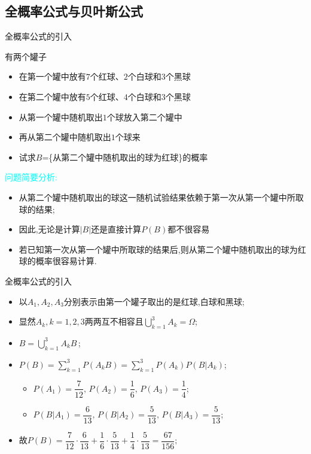 \subsection{全概率公式与贝叶斯公式}
\begin{frame}{全概率公式的引入}

	\begin{exam}
		有两个罐子
			\begin{itemize}[<+-|alert@+>]
			\item 在第一个罐中放有$7$个红球、$2$个白球和$3$个黑球
			\item 在第二个罐中放有$5$个红球、$4$个白球和$3$个黑球
			\item 从第一个罐中随机取出$1$个球放入第二个罐中
			\item 再从第二个罐中随机取出$1$个球来
			\item 试求$B$=\{从第二个罐中随机取出的球为红球\}的概率
		\end{itemize}
	\end{exam}
	\pause
	 \textcolor{cyan}{问题简要分析:}
	\begin{itemize}[<+-|alert@+>]
		\item 从第二个罐中随机取出的球这一随机试验结果依赖于第一次从第一个罐中所取球的结果;
		\item 因此,无论是计算$|B|$还是直接计算$P(B)$都不很容易
		\item 若已知第一次从第一个罐中所取球的结果后,则从第二个罐中随机取出的球为红球的概率很容易计算.
	\end{itemize}
\end{frame}

\begin{frame}{全概率公式的引入}
	\begin{jieda}
	\begin{itemize}[<+-|alert@+>]
		\item 以$A_1,A_2,A_3$分别表示由第一个罐子取出的是红球,白球和黑球;
		\item 显然$A_k, k=1,2,3$两两互不相容且$\bigcup_{k=1}^3A_k=\Omega$;
		\item $B=\bigcup_{k=1}^{3}A_kB\,$;
		\item $ P(B)=\sum_{k=1}^{3} P(A_kB)=\sum_{k=1}^{3} P(A_k) P(B|A_k)$;
		\begin{itemize}
			\item $ P(A_1)=\dfrac{7}{12},\, P(A_2)=\dfrac{1}{6},\, P(A_3)=\dfrac{1}{4}$;
			\item $ P(B|A_1)=\dfrac{6}{13},\, P(B|A_2)=\dfrac{5}{13},\, P(B|A_3)=\dfrac{5}{13}$;
		\end{itemize}
	\item 故$ P(B)=\dfrac{7}{12}·\dfrac{6}{13}+\dfrac{1}{6}·\dfrac{5}{13}+\dfrac{1}{4}·\dfrac{5}{13}=\dfrac{67}{156};$
	\end{itemize}
	\end{jieda}
\end{frame}

